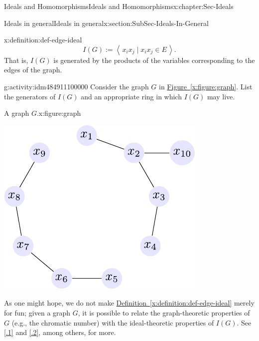 \documentclass[oneside,10pt,]{book}
\newcommand{\xreffont}{\relax}
\numberwithin{equation}{section}
\newcommand{\ideal}[1]{\left\langle\, #1 \,\right\rangle}
\begin{document}
\begin{chapterptx}{Ideals and Homomorphisms}{}{Ideals and Homomorphisms}{}{}{x:chapter:Sec-Ideals}
\begin{sectionptx}{Ideals in general}{}{Ideals in general}{}{}{x:section:SubSec-Ideals-In-General}
\begin{definition}{}{x:definition:def-edge-ideal}
\begin{equation*}
I(G) := \ideal{x_i x_j \mid x_i x_j\in E}.
\end{equation*}
That is, \(I(G)\) is generated by the products of the variables corresponding to the edges of the graph.%
\end{definition}
\begin{activity}{}{g:activity:idm484911100000}%
Consider the graph \(G\) in \hyperref[x:figure:graph]{Figure~{\xreffont\ref{x:figure:graph}}}. List the generators of \(I(G)\) and an appropriate ring in which \(I(G)\) may live.%
\end{activity}
\begin{figureptx}{A graph \(G\).}{x:figure:graph}{}%
\begin{image}{0.25}{0.5}{0.25}%
\includegraphics[width=\linewidth]{../images/graph.pdf}
\end{image}%
\tcblower
\end{figureptx}%
As one might hope, we do not make \hyperref[x:definition:def-edge-ideal]{Definition~{\xreffont\ref{x:definition:def-edge-ideal}}} merely for fun; given a graph \(G\), it is possible to relate the graph-theoretic properties of \(G\) (e.g., the chromatic number) with the ideal-theoretic properties of \(I(G)\). See \hyperlink{x:biblio:vantuyl-intro}{[{\xreffont 4.1.1}]} and \hyperlink{x:biblio:mfo-waldschmidt}{[{\xreffont 4.1.2}]}, among others, for more.%
%
%
\typeout{************************************************}
\typeout{************************************************}

\end{sectionptx}
\end{chapterptx}
\end{document}
